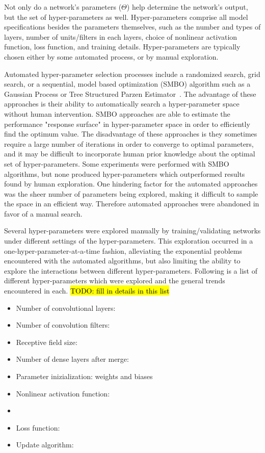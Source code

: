 Not only do a network's parameters ($\Theta$) help determine the network's output, but the set of hyper-parameters as well.
Hyper-parameters comprise all model specifications besides the parameters themselves, such as the number and types of layers, number of units/filters in each layers, choice of nonlinear activation function, loss function, and training details.
Hyper-parameters are typically chosen either by some automated process, or by manual exploration.

Automated hyper-parameter selection processes include a randomized search, grid search, or a sequential, model based optimization (SMBO) algorithm such as a Gaussian Process or Tree Structured Parzen Estimator~\cite{bergstra2011}.
The advantage of these approaches is their ability to automatically search a hyper-parameter space without human intervention. 
SMBO approaches are able to estimate the performance "response surface" in hyper-parameter space in order to efficiently find the optimum value.
The disadvantage of these approaches is they sometimes require a large number of iterations in order to converge to optimal parameters, and it may be difficult to incorporate human prior knowledge about the optimal set of hyper-parameters.
Some experiments were performed with SMBO algorithms, but none produced hyper-parameters which outperformed results found by human exploration.
One hindering factor for the automated approaches was the sheer number of parameters being explored, making it difficult to sample the space in an efficient way.
Therefore automated approaches were abandoned in favor of a manual search.

Several hyper-parameters were explored manually by training/validating networks under different settings of the hyper-parameters.
This exploration occurred in a one-hyper-parameter-at-a-time fashion, alleviating the exponential problems encountered with the automated algorithms, but also limiting the ability to explore the interactions between different hyper-parameters.
Following is a list of different hyper-parameters which were explored and the general trends encountered in each.
\hl{TODO: fill in details in this list}
\begin{itemize}
	\item Number of convolutional layers:
	\item Number of convolution filters:
	\item Receptive field size:
	\item Number of dense layers after merge:
	\item Parameter inizialization: weights and biases
	\item Nonlinear activation function:
	\item 
	\item Loss function:
	\item Update algorithm:
\end{itemize}

